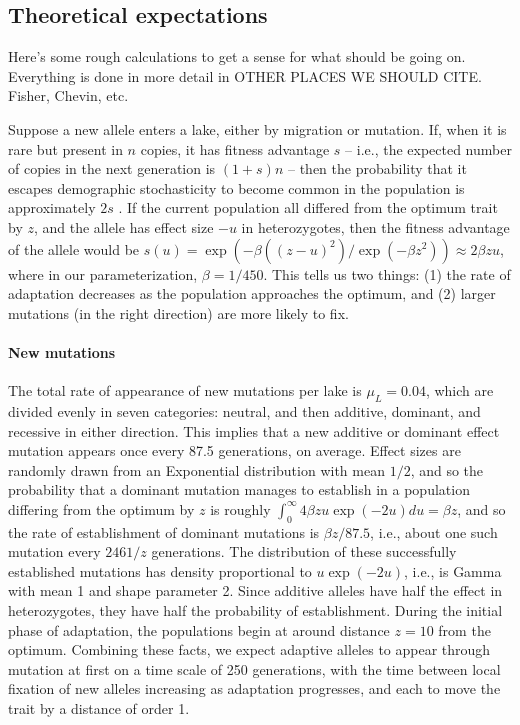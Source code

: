 \documentclass{article}
\newcommand{\plr}[1]{\todo[linecolor=blue,backgroundcolor=blue!25,bordercolor=blue]{#1}}
\begin{document}

\subsection*{Theoretical expectations}
\plr{does this go first or second?}

Here's some rough calculations to get a sense for what should be going on.
Everything is done in more detail in OTHER PLACES WE SHOULD CITE.
Fisher, Chevin, etc.

Suppose a new allele enters a lake, either by migration or mutation.
If, when it is rare but present in $n$ copies,
it has fitness advantage $s$
-- i.e., the expected number of copies in the next generation is $(1+s)n$ --
then the probability that it escapes demographic stochasticity to become common in the population
is approximately $2s$ \citep{fisher,prob_fixation}.
If the current population all differed from the optimum trait by $z$,
and the allele has effect size $-u$ in heterozygotes,
then the fitness advantage of the allele would be
$s(u) = \exp(-\beta((z - u)^2) / \exp( - \beta z^2)) \approx 2 \beta z u$,
where in our parameterization, $\beta = 1 / 450$.
This tells us two things:
(1) the rate of adaptation decreases as the population approaches the optimum,
and (2) larger mutations (in the right direction) are more likely to fix.

\paragraph{New mutations}
The total rate of appearance of new mutations per lake is $\mu_L = 0.04$,
which are divided evenly in seven categories: neutral, and then additive, dominant, and recessive
in either direction.
This implies that a new additive or dominant effect mutation appears once every 87.5 generations,
on average.
Effect sizes are randomly drawn from an Exponential distribution with mean $1/2$, 
and so the probability that a dominant mutation manages to establish in a population differing from
the optimum by $z$ is roughly
$\int_0^\infty 4 \beta z u \exp(-2u) du = \beta z$,
and so the rate of establishment of dominant mutations is $\beta z / 87.5$,
i.e., about one such mutation every $2461/z$ generations.
The distribution of these successfully established mutations 
has density proportional to $u \exp(-2u)$, i.e., is Gamma with mean 1 and shape parameter 2.
Since additive alleles have half the effect in heterozygotes,
they have half the probability of establishment.
During the initial phase of adaptation,
the populations begin at around distance $z=10$ from the optimum.
Combining these facts, we expect 
adaptive alleles to appear through mutation at first on a time scale of 250 generations,
with the time between local fixation of new alleles increasing as adaptation progresses,
and each to move the trait by a distance of order 1.
\end{document}
